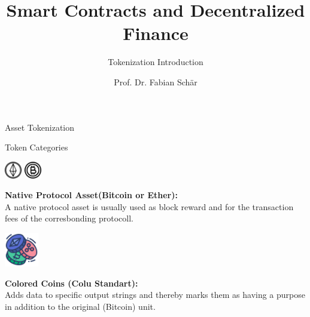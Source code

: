 \documentclass[handout]{beamer}
\title{Smart Contracts and Decentralized Finance}
\subtitle{Tokenization Introduction}
\author{Prof. Dr. Fabian Schär}
\institute{University of Basel}
\begin{document}
\thispagestyle{empty}
\begin{frame}[noframenumbering]
	\titlepage
\end{frame}


\begin{frame}{Asset Tokenization}
	\begin{figure} [h]
 		\center
			
 	\end{figure}
\end{frame}


\begin{frame}{Token Categories}
	\begin{minipage}{0.2\textwidth}
			\begin{center}
				\includegraphics[height=2em]{../assets/images/ethertoken}
				\includegraphics[height=2em]{../assets/images/bitcointoken}
			\end{center}
		\end{minipage}
		\begin{minipage}{0.7\textwidth}
			\textbf{Native Protocol Asset(Bitcoin or Ether):} \\
			A native protocol asset is usually used as block reward and for the transaction fees of the corresbonding protocoll.
		\end{minipage}
	
		\pause
		\vspace{1.5 em}
		\begin{minipage}{0.2\textwidth}
			\begin{center}
				\includegraphics[height=4em]{../assets/images/colored_coins}
			\end{center}
		\end{minipage}
		\begin{minipage}{0.7\textwidth}
			\textbf{Colored Coins (Colu Standart):} \\
			Adds data to specific output strings and thereby marks them as having a purpose in addition to the original (Bitcoin) unit.
		\end{minipage}
	

\end{frame}
\end{document}
